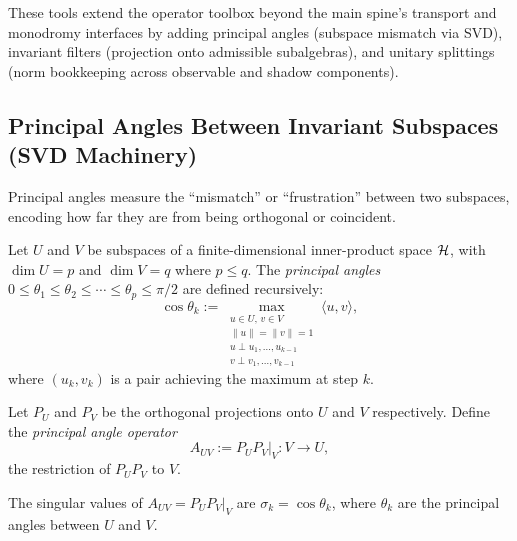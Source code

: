 \label{sec:advanced-operators-iii}

These tools extend the operator toolbox beyond the main spine's transport and
monodromy interfaces by adding principal angles (subspace mismatch via SVD),
invariant filters (projection onto admissible subalgebras), and unitary
splittings (norm bookkeeping across observable and shadow components).

\subsection{Principal Angles Between Invariant Subspaces (SVD Machinery)}
\label{subsec:principal-angles}

Principal angles measure the ``mismatch'' or ``frustration'' between two subspaces, encoding how far they are from being orthogonal or coincident.

\begin{definition}
\label{def:principal-angles}
Let $U$ and $V$ be subspaces of a finite-dimensional inner-product space $\mathcal{H}$, with $\dim U = p$ and $\dim V = q$ where $p \le q$.
The \emph{principal angles} $0 \le \theta_1 \le \theta_2 \le \cdots \le \theta_p \le \pi/2$ are defined recursively:
\[
\cos\theta_k := \max_{\substack{u \in U,\, v \in V \\ \|u\|=\|v\|=1 \\ u \perp u_1, \ldots, u_{k-1} \\ v \perp v_1, \ldots, v_{k-1}}} \langle u, v \rangle,
\]
where $(u_k, v_k)$ is a pair achieving the maximum at step $k$.
\end{definition}

\begin{definition}
\label{def:principal-angle-operator}
Let $P_U$ and $P_V$ be the orthogonal projections onto $U$ and $V$ respectively.
Define the \emph{principal angle operator}
\[
A_{UV} := P_U P_V|_V : V \to U,
\]
the restriction of $P_U P_V$ to $V$.
\end{definition}

\begin{proposition}
\label{prop:svd-principal}
The singular values of $A_{UV} = P_U P_V|_V$ are $\sigma_k = \cos\theta_k$, where $\theta_k$ are the principal angles between $U$ and $V$.
\end{proposition}

